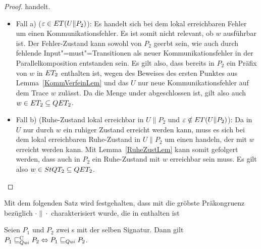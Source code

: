 \begin{proof}
  handelt.
  \begin{itemize}
    \item Fall a) ($\varepsilon\in ET (U\|P_2)$): Es handelt sich bei dem lokal
      erreichbaren Fehler um einen Kommunikationsfehler. Es ist somit nicht
      relevant, ob $w$ ausführbar ist. Der Fehler-Zustand kann sowohl von $P_2$
      geerbt sein, wie auch durch fehlende Input"=must"=Transitionen als neuer
      Kommunikationsfehler in der Parallelkomposition entstanden sein. Es gilt
      also, dass bereits in $P_2$ ein Präfix von $w$ in $ET _2$ enthalten ist,
      wegen des Beweises des ersten Punktes aus Lemma~\ref{KommVerfeinLem} und
      das $U$ nur neue Kommunikationsfehler auf dem Trace $w$ zulässt. Da die
      Menge \ET{} under \cont{} abgeschlossen ist, gilt also auch $w\in ET
      _2\subseteq QET _2$.
    \item Fall b) (Ruhe-Zustand lokal erreichbar in $U\|P_2$ und
      $\varepsilon\notin ET (U\|P_2)$): Da in $U$ nur durch $w$ ein ruhiger
      Zustand erreicht werden kann, muss es sich bei dem lokal erreichbaren
      Ruhe-Zustand in $U\|P_2$ um einen handeln, der mit $w$ erreicht werden
      kann. Mit Lemma~\ref{RuheZustLem} kann somit gefolgert werden, dass auch
      in $P_2$ ein Ruhe-Zustand mit $w$ erreichbar sein muss. Es gilt also
      $w\in StQT _2\subseteq QET _2$.
  \end{itemize}
\end{proof}

Mit dem folgenden Satz wird festgehalten, dass mit \QRel{} die gröbste
Präkongruenz bezüglich $\cdot\|\cdot$ charakterisiert wurde, die in \QBRel{}
enthalten ist

\begin{Satz}
  \label{RuheVollAbstraktSatz}
  Seien $P_1$ und $P_2$ zwei \MEIO{}s mit der selben Signatur. Dann gilt
  $P_1 \sqsubseteq  _{Qui}^\mathrm{C} P_2\Leftrightarrow P_1 \sqsubseteq  _{Qui} P_2$.
\end{Satz}

